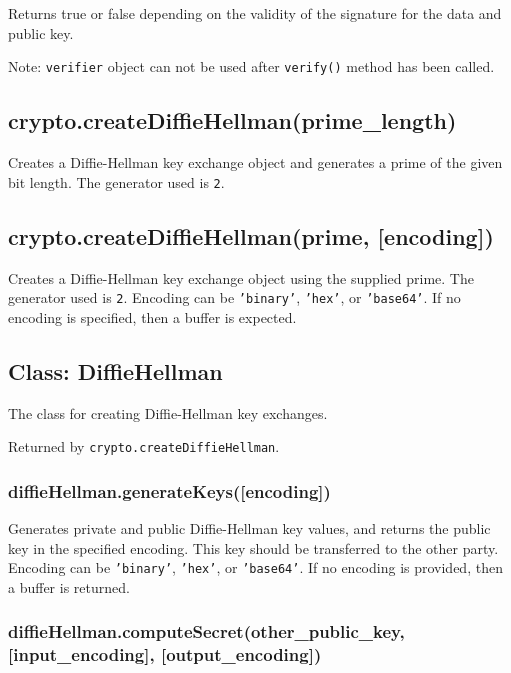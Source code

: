 Returns true or false depending on the validity of the signature for the
data and public key.

Note: \texttt{verifier} object can not be used after \texttt{verify()}
method has been called.

\subsection{crypto.createDiffieHellman(prime\_length)}\label{crypto.creatediffiehellmanprimeux5flength}

Creates a Diffie-Hellman key exchange object and generates a prime of
the given bit length. The generator used is \texttt{2}.

\subsection{crypto.createDiffieHellman(prime,
{[}encoding{]})}\label{crypto.creatediffiehellmanprime-encoding}

Creates a Diffie-Hellman key exchange object using the supplied prime.
The generator used is \texttt{2}. Encoding can be \texttt{'binary'},
\texttt{'hex'}, or \texttt{'base64'}. If no encoding is specified, then
a buffer is expected.

\subsection{Class: DiffieHellman}\label{class-diffiehellman}

The class for creating Diffie-Hellman key exchanges.

Returned by \texttt{crypto.createDiffieHellman}.

\subsubsection{diffieHellman.generateKeys({[}encoding{]})}\label{diffiehellman.generatekeysencoding}

Generates private and public Diffie-Hellman key values, and returns the
public key in the specified encoding. This key should be transferred to
the other party. Encoding can be \texttt{'binary'}, \texttt{'hex'}, or
\texttt{'base64'}. If no encoding is provided, then a buffer is
returned.

\subsubsection{diffieHellman.computeSecret(other\_public\_key,
{[}input\_encoding{]},
{[}output\_encoding{]})}\label{diffiehellman.computesecretotherux5fpublicux5fkey-inputux5fencoding-outputux5fencoding}


